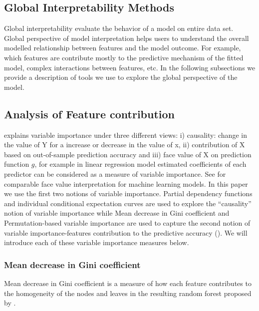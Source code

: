 \documentclass[11pt,a4paper,]{article}
\begin{document}
\subsection{Global Interpretability
Methods}\label{global-interpretability-methods}

Global interpretability evaluate the behavior of a model on entire data
set. Global perspective of model interpretation helps users to
understand the overall modelled relationship between features and the
model outcome. For example, which features are contribute mostly to the
predictive mechanism of the fitted model, complex interactions between
features, etc. In the following subsections we provide a description of
tools we use to explore the global perspective of the model.

\subsection{Analysis of Feature
contribution}\label{analysis-of-feature-contribution}

\textcite{jiang2002} explains variable importance under three different
views: i) causality: change in the value of Y for a increase or decrease
in the value of x, ii) contribution of X based on out-of-sample
prediction accuracy and iii) face value of X on prediction function
\(g\), for example in linear regression model estimated coefficients of
each predictor can be considered as a measure of variable importance.
See \textcite{jiang2002} for comparable face value interpretation for
machine learning models. In this paper we use the first two notions of
variable importance. Partial dependency functions and individual
conditional expectation curves are used to explore the ``causality''
notion of variable importance while Mean decrease in Gini coefficient
and Permutation-based variable importance are used to capture the second
notion of variable importance-features contribution to the predictive
accuracy (\textcite{Zhao}). We will introduce each of these variable
importance measures below.

\subsubsection{Mean decrease in Gini
coefficient}\label{mean-decrease-in-gini-coefficient}

Mean decrease in Gini coefficient is a measure of how each feature
contributes to the homogeneity of the nodes and leaves in the resulting
random forest proposed by \textcite{breiman2001random}.
\end{document}
